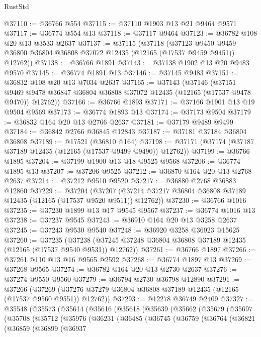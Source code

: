 \begin{lexlean}{RustStd}
\begin{coremodule}
@37110 := @36766 @554
@37115 := @37110 @1903 @13 @21 @9464 @9571
@37117 := @36774 @554 @13
@37118 := @37117 @9464
@37123 := @36782 @108 @20 @13 @3533 @2637
@37137 := @37115
    (@37118
      (@37123 @9450 @9459 @36800 @36804 @36808 @37072 @12435 (@12165 (@17537 @9459 @9451)) @12762))
@37138 := @36766 @1891
@37143 := @37138 @1902 @13 @20 @9483 @9570
@37145 := @36774 @1891 @13
@37146 := @37145 @9483
@37151 := @36832 @108 @20 @13 @7034 @2637
@37165 := @37143
    (@37146
      (@37151 @9469 @9478 @36847 @36804 @36808 @37072 @12435 (@12165 (@17537 @9478 @9470)) @12762))
@37166 := @36766 @1893
@37171 := @37166 @1901 @13 @19 @9504 @9569
@37173 := @36774 @1893 @13
@37174 := @37173 @9504
@37179 := @36832 @164 @20 @13 @2766 @2637
@37181 := @37179 @9489 @9499
@37184 := @36842 @2766 @36845 @12843
@37187 := @37181 @37184 @36804 @36808
@37189 := @17521 (@36810 @164)
@37198 := @37171 (@37174 (@37187 @37189 @12435 (@12165 (@17537 @9499 @9490)) @12762))
@37199 := @36766 @1895
@37204 := @37199 @1900 @13 @18 @9525 @9568
@37206 := @36774 @1895 @13
@37207 := @37206 @9525
@37212 := @36870 @164 @20 @13 @2768 @2637
@37214 := @37212 @9510 @9520
@37217 := @36880 @2768 @36883 @12860
@37229 := @37204
    (@37207 (@37214 @37217 @36804 @36808 @37189 @12435 (@12165 (@17537 @9520 @9511)) @12762))
@37230 := @36766 @1016
@37235 := @37230 @1899 @13 @17 @9545 @9567
@37237 := @36774 @1016 @13
@37238 := @37237 @9545
@37243 := @36910 @164 @20 @13 @3258 @2637
@37245 := @37243 @9530 @9540
@37248 := @36920 @3258 @36923 @15625
@37260 := @37235
    (@37238 (@37245 @37248 @36804 @36808 @37189 @12435 (@12165 (@17537 @9540 @9531)) @12762))
@37261 := @36766 @1897
@37266 := @37261 @110 @13 @16 @9565 @2592
@37268 := @36774 @1897 @13
@37269 := @37268 @9565
@37274 := @36782 @164 @20 @13 @2730 @2637
@37276 := @37274 @9550 @9560
@37279 := @36794 @2730 @36798 @12890
@37291 := @37266
    (@37269 (@37276 @37279 @36804 @36808 @37189 @12435 (@12165 (@17537 @9560 @9551)) @12762))
@37293 := @12278 @36749 @2409
@37327 := @35548
    (@35573
      (@35614
        (@35616
          (@35618
            (@35639
              (@35662
                (@35679
                  (@35697
                    (@35708
                      (@35712
                        (@35976
                          (@36231
                            (@36485
                              (@36745
                                (@36759
                                  (@36764
                                    (@36821
                                      (@36859
                                        (@36899
                                          (@36937

\end{coremodule}
\end{lexlean}
